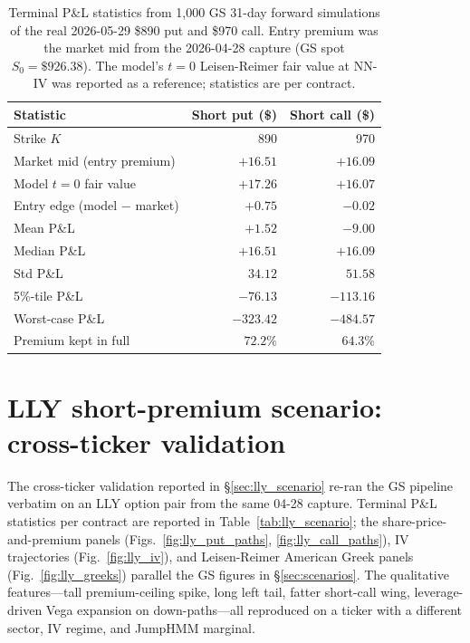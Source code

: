 \begin{table}[ht]
\centering
\caption{Terminal P\&L statistics from 1{,}000 GS 31-day forward simulations of the real 2026-05-29 \$890 put and \$970 call. Entry premium was the market mid from the 2026-04-28 capture (GS spot $S_0 = \$926.38$). The model's $t=0$ Leisen-Reimer fair value at NN-IV was reported as a reference; statistics are per contract.}
\label{tab:gs_scenario}
\begin{tabular}{lrr}
\toprule
Statistic & Short put (\$) & Short call (\$) \\
\midrule
Strike $K$                  & 890        & 970       \\
Market mid (entry premium)  & $+16.51$   & $+16.09$  \\
Model $t=0$ fair value      & $+17.26$   & $+16.07$  \\
Entry edge (model $-$ market) & $+0.75$  & $-0.02$   \\
\midrule
Mean P\&L                    &  $+1.52$  &  $-9.00$  \\
Median P\&L                  & $+16.51$  & $+16.09$  \\
Std P\&L                     &  $34.12$  &  $51.58$  \\
5\%-tile P\&L                & $-76.13$  & $-113.16$ \\
Worst-case P\&L              & $-323.42$ & $-484.57$ \\
Premium kept in full         & $72.2\%$  & $64.3\%$  \\
\bottomrule
\end{tabular}
\end{table}

\section{LLY short-premium scenario: cross-ticker validation}\label{sec:supp_lly_scenario}

The cross-ticker validation reported in §\ref{sec:lly_scenario} re-ran the GS pipeline verbatim on an LLY option pair from the same 04-28 capture. Terminal P\&L statistics per contract are reported in Table~\ref{tab:lly_scenario}; the share-price-and-premium panels (Figs.~\ref{fig:lly_put_paths}, \ref{fig:lly_call_paths}), IV trajectories (Fig.~\ref{fig:lly_iv}), and Leisen-Reimer American Greek panels (Fig.~\ref{fig:lly_greeks}) parallel the GS figures in §\ref{sec:scenarios}. The qualitative features---tall premium-ceiling spike, long left tail, fatter short-call wing, leverage-driven Vega expansion on down-paths---all reproduced on a ticker with a different sector, IV regime, and JumpHMM marginal.

